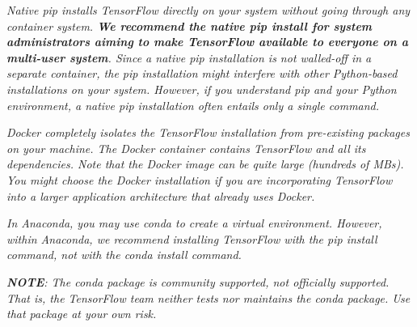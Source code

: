 \documentclass[11pt,a4paper]{ctexart}
\begin{document}
\emph{Native pip installs TensorFlow directly on your system without going through any container system.{\textbf { We recommend the native pip install for system administrators aiming to make TensorFlow available to everyone on a multi-user system}}. Since a native pip installation is not walled-off in a separate container, the pip installation might interfere with other Python-based installations on your system. However, if you understand pip and your Python environment, a native pip installation often entails only a single command.}

\emph{Docker completely isolates the TensorFlow installation from pre-existing packages on your machine. The Docker container contains TensorFlow and all its dependencies. Note that the Docker image can be quite large (hundreds of MBs). You might choose the Docker installation if you are incorporating TensorFlow into a larger application architecture that already uses Docker.}

\emph{In Anaconda, you may use conda to create a virtual environment. However, within Anaconda, we recommend installing TensorFlow with the \emph{pip install} command, not with the \emph{conda install} command.}

\emph{{\textbf {NOTE}}: The conda package is community supported, not officially supported. That is, the TensorFlow team neither tests nor maintains the conda package. Use that package at your own risk.}
\end{document}
